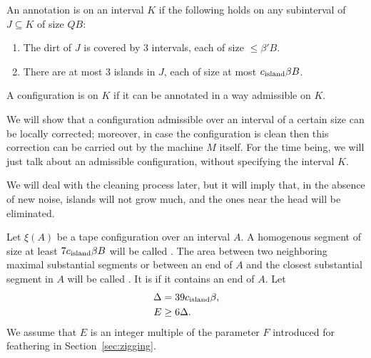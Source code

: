 \documentclass[12pt]{memoir}
\renewcommand{\le}{\leq}
\renewcommand{\ge}{\geq}
\def\B{B}
\newcommand{\E}{E}
\newcommand{\Q}{Q}
\newcommand{\F}{F}
\newcommand{\cns}[1]{c_{\textrm{\upshape #1}}}
\begin{document}
\begin{definition}[Admissibility]\label{def:admissible}
An annotation is  on an interval \( K \) if the following holds on any subinterval 
of \( J\subseteq K \) of size \( \Q\B \):
\begin{enumerate}[label=\upshape{\alph*)},ref=\thelemma.\upshape{\alph*},series=admissible]
\item The dirt of \( J \) is covered by 3 intervals, each of size \( \le \beta'\B \).
\item There are at most 3 islands in \( J \), each of size at most \( \cns{island}\beta\B \).
\end{enumerate}
A configuration is  on \( K \) if it can be annotated in a way admissible on \( K \).
\end{definition}

We will show that a configuration admissible over an interval of a certain size can be locally corrected;
moreover, in case the configuration is clean then this correction
can be carried out by the machine \( M \) itself.
For the time being, we will just talk about an admissible configuration, without specifying the interval
\( K \).

We will deal with the cleaning process later, but it will imply that,
in the absence of new noise, islands will not grow much, and the ones near the head
will be eliminated.

\begin{definition}\label{def:substantial}
Let \( \xi(A) \) be a tape configuration over an interval \( A \).
A homogenous segment of size at least \( 7\cns{island}\beta\B \)
will be called .
The area between two neighboring maximal
substantial segments or between an end of \( A \) and the closest substantial segment in \( A \)
will be called .
It is  if it contains an end of \( A \).
  Let
 \begin{align*}
     \Delta &= 39\cns{island}\beta, %
\\  \E  &\ge 6\Delta. %
 \end{align*}
We assume that \( \E \) is an integer multiple of
the parameter \( \F \) introduced for feathering in Section~\ref{sec:zigging}.
\end{definition}
\end{document}
